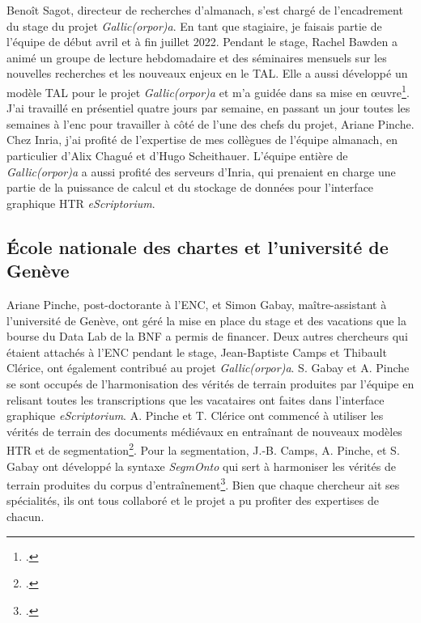 \documentclass[class=article, crop=false]{standalone}
\begin{document}
Benoît Sagot, directeur de recherches d'\acrshort{almanach}, s'est chargé de l'encadrement du stage du projet \textit{Gallic(orpor)a}. En tant que stagiaire, je faisais partie de l'équipe de début avril et à fin juillet 2022. Pendant le stage, Rachel Bawden a animé un groupe de lecture hebdomadaire et des séminaires mensuels sur les nouvelles recherches et les nouveaux enjeux en le \acrlong{TAL}. Elle a aussi développé un modèle \acrshort{TAL} pour le projet \textit{Gallic(orpor)a} et m'a guidée dans sa mise en œuvre\footcite{bawdenAutomaticNormalisationEarly2022, gabayFreEMcorporaFreEMnormFreEM2022}. J'ai travaillé en présentiel quatre jours par semaine, en passant un jour toutes les semaines à l'\Gls{enc} pour travailler à côté de l'une des chefs du projet, Ariane Pinche. Chez \Gls{Inria}, j'ai profité de l'expertise de mes collègues de l'équipe \acrshort{almanach}, en particulier d'Alix Chagué et d'Hugo Scheithauer. L'équipe entière de \textit{Gallic(orpor)a} a aussi profité des serveurs d'\Gls{Inria}, qui prenaient en charge une partie de la puissance de calcul et du stockage de données pour l'interface graphique \acrshort{HTR} \textit{eScriptorium}.

\subsection{École nationale des chartes et l'université de Genève}

Ariane Pinche, post-doctorante à l'\acrlong{ENC}, et Simon Gabay, maître-assistant à l'université de Genève,  ont géré la mise en place du stage et des vacations que la bourse du Data Lab de la \acrshort{BNF} a permis de financer. Deux autres chercheurs qui étaient attachés à l'\acrlong{ENC} pendant le stage, Jean-Baptiste Camps et Thibault Clérice, ont également contribué au projet \textit{Gallic(orpor)a}. S. Gabay et A. Pinche se sont occupés de l'harmonisation des vérités de terrain produites par l'équipe en relisant toutes les transcriptions que les vacataires ont faites dans l'interface graphique \textit{eScriptorium}. A. Pinche et T. Clérice ont commencé à utiliser les vérités de terrain des documents médiévaux en entraînant de nouveaux modèles  \acrshort{HTR} et de segmentation\footcite{clericeYALTAiSegmontoManuscript2022}. Pour la segmentation, J.-B. Camps, A. Pinche, et S. Gabay ont développé la syntaxe \textit{SegmOnto} qui sert à harmoniser les vérités de terrain produites du corpus d'entraînement\footcite{gabaySegmOntoCommonVocabulary2021}. Bien que chaque chercheur ait ses spécialités, ils ont tous collaboré et le projet a pu profiter des expertises de chacun.
\end{document}
